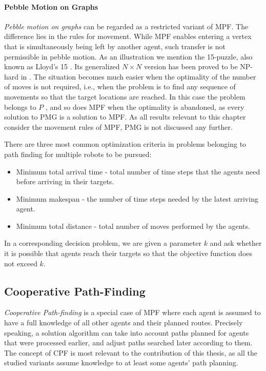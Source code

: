 \paragraph{Pebble Motion on Graphs}
\emph{Pebble motion on graphs} \cite{kornhauser84} can be regarded as a restricted variant of MPF. 
The difference lies in the rules for movement. 
While MPF enables entering a vertex that is simultaneously being left by another agent, such transfer is not permissible in pebble motion. 
As an illustration we mention the 15-puzzle, also known as Lloyd’s 15 \cite{archer99}.
Its generalized $N\times N$ version has been proved to be NP-hard in \cite{ratner86}.  
The situation becomes much easier when the optimality of the number of moves is not required, i.e., when the problem is to find any sequence of movements so that the target locations are reached.
In this case the problem belongs to $P$ \cite{kornhauser84}, and so does MPF when the optimality is abandoned, as every solution to PMG is a solution to MPF.
As all results relevant to this chapter consider the movement rules of MPF, PMG is not discussed any further.

There are three most common optimization criteria \cite{yu13} in problems belonging to path finding for multiple robots to be pursued:
\begin{itemize}
        \item Minimum total arrival time - total number of time steps that the agents need before arriving in their targets.
        \item Minimum makespan - the number of time steps needed by the latest arriving agent.
        \item Minimum total distance - total number of moves performed by the agents.
\end{itemize}
In a corresponding decision problem, we are given a parameter $k$ and ask whether it is possible that agents reach their targets so that the objective function does not exceed $k$.
\subsection{Cooperative Path-Finding}\label{sec:cpf}

\emph{Cooperative Path-finding} \cite{silver05} is a special case of MPF where each agent is assumed to have a full knowledge of all other agents and their planned routes.
Precisely speaking, a solution algorithm can take into account paths planned for agents that were processed earlier, and adjust paths searched later according to them.
The concept of CPF is most relevant to the contribution of this thesis, as all the studied variants assume knowledge to at least some agents' path planning.

